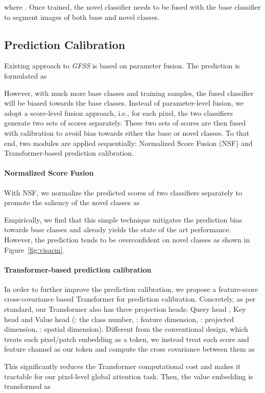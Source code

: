 \documentclass[journal]{IEEEtran}
\begin{document}
where .
Once trained, the novel classifier needs to be fused with the base classifier to segment images of both base and novel classes.

\subsection{Prediction Calibration}
\label{stage2}
Existing approach to \textit{GFSS} is based on parameter fusion. The prediction is formulated as

However, with much more base classes and training samples, the fused classifier will be biased towards the base classes. Instead of parameter-level fusion, we adopt a score-level fusion approach, i.e., for each pixel, the two classifiers generate two sets of scores separately. These two sets of scores are then fused with calibration to avoid bias towards either the base or novel classes. To that end,  two modules are applied sequentially: Normalized Score Fusion (NSF) and Transformer-based prediction calibration.

\paragraph{Normalized Score Fusion} 
With NSF, we normalize the predicted scores of two classifiers separately to promote the saliency of the novel classes as 

Empirically, we find that this simple technique mitigates the prediction bias towards base classes and already yields the state of the art performance. However, the prediction tends to be overconfident on novel classes as shown in  Figure~\ref{fig:visacm}.

\paragraph{Transformer-based prediction calibration} In order to further improve the prediction calibration, we propose a feature-score cross-covariance based Transformer  for prediction calibration. Concretely, as per standard, our Transformer also has three projection heads: Query head , Key head  and Value head  (: the class number, : feature dimension, : projected dimension, : spatial dimension). Different from the conventional design, which treats each pixel/patch embedding as a token, we instead treat each score and feature channel as our token and compute the cross covariance between them as

This significantly reduces the Transformer computational cost and makes it tractable for our pixel-level global attention task. Then, the value embedding is transformed as
\end{document}
